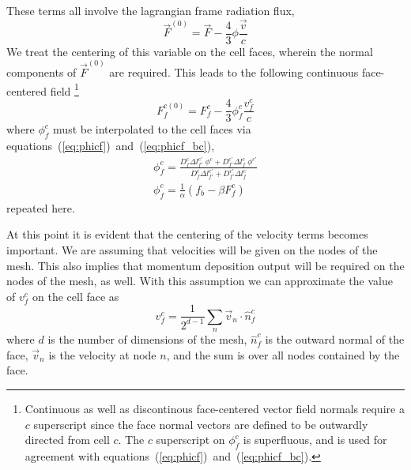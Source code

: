 \documentclass{article}
\newcommand{\bfunc}{\ensuremath{f_{b}}}
\begin{document}
These terms all involve the lagrangian frame radiation flux,
\begin{equation}
        \vec{F}^{(0)} = \vec{F} - \frac{4}{3} \phi \frac{\vec{v}}{c}
\end{equation}
We treat the centering of this variable on the cell faces, wherein the normal
components of $\vec{F}^{(0)}$ are required.
This leads to the following continuous face-centered field%
\footnote{%
   Continuous as well as discontinous
   face-centered vector field normals require a $c$ superscript
   since the face normal vectors are defined to be outwardly directed from
   cell $c$.
   The $c$ superscript on $\phi^{c}_{f}$ is superfluous, and is used
   for agreement with equations~(\ref{eq:phicf})~and~(\ref{eq:phicf_bc}).
}
\begin{equation}
  \boxed{
        F^{c(0)}_{f} = F^{c}_{f} - \frac{4}{3} \phi^{c}_{f} \frac{v^{c}_{f}}{c}
  }
\end{equation}
where $\phi^{c}_{f}$ must be interpolated to the cell faces
via equations~(\ref{eq:phicf})~and~(\ref{eq:phicf_bc}),
\begin{gather}
   \boxed{
        \phi^{c}_{f} =  \frac
                        { D^{c}_{f} \Delta l^{c'}_{f'} \; \phi^{c} 
                            + D^{c'}_{f'} \Delta l^{c}_{f} \; \phi^{c'} 
                        }
                        { D^{c}_{f} \Delta l^{c'}_{f'}
                            + D^{c'}_{f'} \Delta l^{c}_{f}
                        }
   } \\
   \boxed{
        \phi^{c}_{f} = \frac{1}{\alpha} \left( \bfunc - \beta F^{c}_{f} \right)
   }
\end{gather}
repeated here.

At this point it is evident that the centering of the velocity terms
becomes important.
We are assuming that velocities will be given on the nodes of the mesh.
This also implies that momentum deposition output will be required on
the nodes of the mesh, as well.
With this assumption we can approximate the value of $v^{c}_{f}$
on the cell face as
\begin{equation}
  \boxed{
     v^{c}_{f} = \frac{1}{2^{d-1}} \sum_{n} \vec{v}_{n} \cdot \hat{n}^{c}_{f}
  }
\end{equation}
where $d$ is the number of dimensions of the mesh,
$\hat{n}^{c}_{f}$ is the outward normal of the face,
$\vec{v}_{n}$ is the velocity at node $n$,
and the sum is over all nodes contained by the face.
\end{document}
